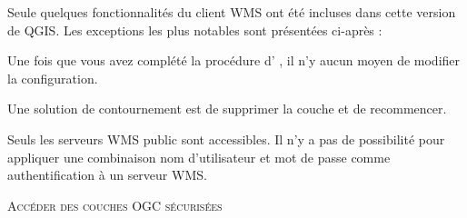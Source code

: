 Seule quelques fonctionnalit\'es du client WMS ont \'et\'e incluses dans cette
version de QGIS. Les exceptions les plus notables sont pr\'esent\'ees ci-apr\`es :


Une fois que vous avez compl\'et\'e la proc\'edure d'
, il n'y aucun moyen
de modifier la configuration.

Une solution de contournement est de supprimer la couche et de recommencer.


Seuls les serveurs WMS public sont accessibles.
Il n'y a pas de possibilit\'e pour appliquer une combinaison nom d'utilisateur
et mot de passe comme authentification \`a un serveur WMS.

\begin{Tip}[ht]\caption{\textsc{Acc\'eder des couches OGC s\'ecuris\'ees}}
\end{Tip}


